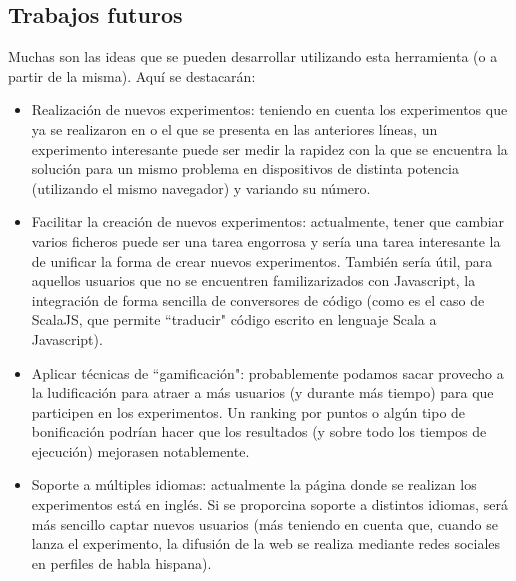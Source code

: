 \documentclass[runningheads,a4paper]{llncs}
\begin{document}
\subsection{Trabajos futuros}
Muchas son las ideas que se pueden desarrollar utilizando esta herramienta (o a
partir de la misma). Aqu\'i se destacar\'an:
\begin{itemize}
  \item Realizaci\'on de nuevos experimentos: teniendo en cuenta los experimentos
  que ya se realizaron en \cite{nodio} o el que se presenta en las anteriores l\'ineas,
  un experimento interesante puede ser medir la rapidez con la que se encuentra
  la soluci\'on para un mismo problema en dispositivos de distinta potencia (utilizando
  el mismo navegador) y variando su n\'umero.
  \item Facilitar la creaci\'on de nuevos experimentos: actualmente, tener que cambiar
  varios ficheros puede ser una tarea engorrosa y sería una tarea interesante
  la de unificar la forma de crear nuevos experimentos. También sería útil, para
  aquellos usuarios que no se encuentren familizarizados con Javascript, la
  integraci\'on de forma sencilla de conversores de c\'odigo (como es el caso de ScalaJS,
  que permite ``traducir" c\'odigo escrito en lenguaje Scala a Javascript).
  \item Aplicar t\'ecnicas de ``gamificaci\'on": probablemente podamos sacar
  provecho a la ludificaci\'on para atraer a m\'as usuarios (y durante m\'as tiempo)
  para que participen en los experimentos. Un ranking por puntos o alg\'un tipo de
  bonificaci\'on podr\'ian hacer que los resultados (y sobre todo los tiempos de
  ejecuci\'on) mejorasen notablemente.
  \item Soporte a m\'ultiples idiomas: actualmente la p\'agina donde se realizan los
  experimentos est\'a en ingl\'es. Si se proporcina soporte a distintos idiomas,
  ser\'a m\'as sencillo captar nuevos usuarios (m\'as teniendo en cuenta que,
  cuando se lanza el experimento, la difusi\'on de la web se realiza mediante
  redes sociales en perfiles de habla hispana).
\end{itemize}





\nocite{*}
\end{document}
